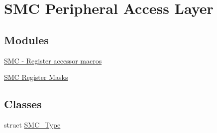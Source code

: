 \hypertarget{group__SMC__Peripheral__Access__Layer}{}\section{S\+MC Peripheral Access Layer}
\label{group__SMC__Peripheral__Access__Layer}
\subsection*{Modules}
\begin{DoxyCompactItemize}
\item 
\hyperlink{group__SMC__Register__Accessor__Macros}{S\+M\+C -\/ Register accessor macros}
\item 
\hyperlink{group__SMC__Register__Masks}{S\+M\+C Register Masks}
\end{DoxyCompactItemize}
\subsection*{Classes}
\begin{DoxyCompactItemize}
\item 
struct \hyperlink{structSMC__Type}{S\+M\+C\+\_\+\+Type}
\end{DoxyCompactItemize}
